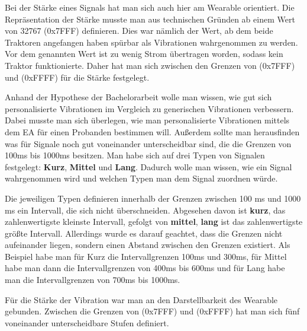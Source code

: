 Bei der St{\"a}rke eines Signals hat man sich auch hier am Wearable orientiert. 
Die Repr{\"a}sentation der St{\"a}rke musste man aus technischen Gr{\"u}nden ab einem Wert von 32767 (0x7FFF) definieren. Dies war n{\"a}mlich der Wert, ab dem beide Traktoren angefangen haben sp{\"u}rbar als Vibrationen wahrgenommen zu werden.
Vor dem genannten Wert ist zu wenig Strom {\"u}bertragen worden, sodass kein Traktor funktionierte.
Daher hat man sich zwischen den Grenzen von (0x7FFF) und (0xFFFF) f{\"u}r die St{\"a}rke festgelegt. 

Anhand der Hypothese der Bachelorarbeit wolle man wissen, wie gut sich personalisierte Vibrationen im Vergleich zu generischen Vibrationen verbessern. Dabei musste man sich {\"u}berlegen, wie man personalisierte Vibrationen mittels dem EA f{\"u}r einen Probanden bestimmen will.
Au{\ss}erdem sollte man herausfinden was f{\"u}r Signale noch gut voneinander unterscheidbar sind, die die Grenzen von 100ms bis 1000ms besitzen.
Man habe sich auf drei Typen von Signalen festgelegt: \textbf{Kurz}, \textbf{Mittel} und \textbf{Lang}. Dadurch wolle man wissen, wie ein Signal wahrgenommen wird und welchen Typen man dem Signal zuordnen w{\"u}rde.

Die jeweiligen Typen definieren innerhalb der Grenzen zwischen 100 ms und 1000 ms ein Intervall, die sich nicht {\"u}berschneiden. Abgesehen davon ist \textbf{kurz}, das zahlenwertigste kleinste Intervall, gefolgt von \textbf{mittel}, \textbf{lang} ist das zahlenwertigste gr{\"o}{\ss}te Intervall.
Allerdings wurde es darauf geachtet, dass die Grenzen nicht aufeinander liegen, sondern einen Abstand zwischen den Grenzen existiert.
Als Beispiel habe man f{\"u}r Kurz die Intervallgrenzen 100ms und 300ms, f{\"u}r Mittel habe man dann die Intervallgrenzen von 400ms bis 600ms und f{\"u}r Lang habe man die Intervallgrenzen von 700ms bis 1000ms. 

F{\"u}r die St{\"a}rke der Vibration war man an den Darstellbarkeit des Wearable gebunden. Zwischen die Grenzen von (0x7FFF) und (0xFFFF) hat man sich f{\"u}nf voneinander unterscheidbare Stufen definiert.




